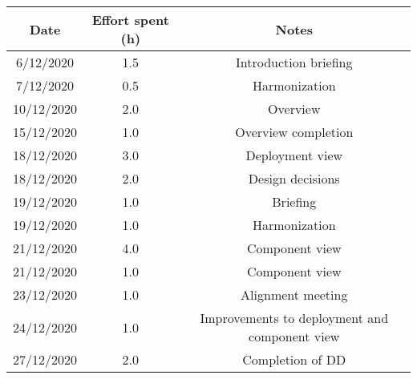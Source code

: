 \documentclass[../../main.tex]{subfiles}
\begin{document}
    \begin{center}
        \begin{tabular}{|c| |c| |c|} 
            \hline
            Date & Effort spent (h) & Notes\\ [0.5ex] 
            \hline\hline
            6/12/2020 & 1.5 & Introduction briefing\\ 
            7/12/2020 & 0.5 & Harmonization\\
            10/12/2020 & 2.0 & Overview\\
            15/12/2020 & 1.0 & Overview completion\\
            18/12/2020 & 3.0 & Deployment view\\
            18/12/2020 & 2.0 & Design decisions\\
            19/12/2020 & 1.0 & Briefing\\
            19/12/2020 & 1.0 & Harmonization\\
            21/12/2020 & 4.0 & Component view\\
            21/12/2020 & 1.0 & Component view\\
            23/12/2020 & 1.0 & Alignment meeting\\
            24/12/2020 & 1.0 & Improvements to deployment and component view\\
            27/12/2020 & 2.0 & Completion of DD\\
            \hline
        \end{tabular}
    \end{center}
\end{document}
